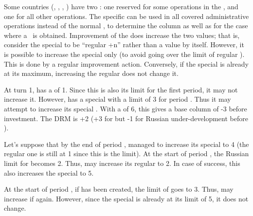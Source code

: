 \label{chExpenses:Special FTI} Some countries
(\POR, \RUS, \SPA, \HOL) have two \FTI: one reserved for some operations in
the \ROTW, and one for all other operations.
\bparag The specific \FTI can be used in all covered administrative operations
instead of the normal \FTI, to determine the column as well as for the case
where a \undemi\ is obtained.
\bparag Improvement of the \FTI does increase the two values; that is,
consider the special \FTI to be ``regular \FTI +n'' rather than a value by
itself.
\bparag However, it is possible to increase the special \FTI only (to avoid
going over the limit of regular \FTI). This is done by a regular \FTI
improvement action.
\bparag Conversely, if the special \FTI is already at its maximum, increasing
the regular \FTI does not change it.

\begin{exemple}
  At turn 1, \RUS has a \FTI of 1. Since this is also its limit for the first
  period, it may not increase it. However, \RUS has a special \FTI with a
  limit of 3 for period . Thus it may attempt to increase its
  special \FTI. With a \ADM of 6, this gives a base column of -3 before
  investment. The DRM is +2 (+3 for \STAB but -1 for Russian under-development
  before ).

  Let's suppose that by the end of period , \RUS managed to increase
  its special \FTI to 4 (the regular one is still at 1 since this is the
  limit). At the start of period , the Russian limit for \FTI
  becomes 2. Thus, \RUS may increase its regular \FTI to 2. In case of
  success, this also increases the special \FTI to 5.

  At the start of period , if  has been
  created, the limit of \FTI goes to 3. Thus, \RUS may increase if
  again. However, since the special \FTI is already at its limit of 5, it does
  not change.
\end{exemple}


